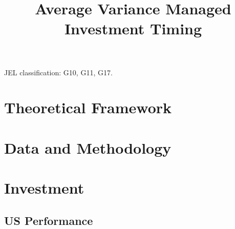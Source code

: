 \documentclass[11pt]{article}
\begin{document}
\onehalfspacing      %


\title{\Large \bf Average Variance Managed Investment Timing}

\date{}              %


\maketitle
\thispagestyle{empty}

\bigskip



\medskip

\noindent JEL classification: G10, G11, G17.

\clearpage

%



\section{Theoretical Framework} \label{sec:theory}



\section{Data and Methodology} \label{sec:Data}



\section{Investment} \label{sec:asset_allocation}



\subsection{US Performance} \label{sec:port_performance}
\end{document}
